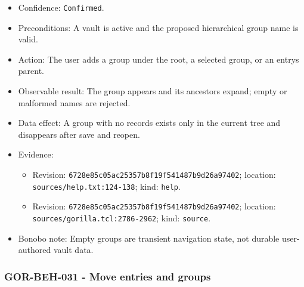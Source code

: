 \documentclass[
  letterpaper,
]{article}
\newcommand{\passthrough}[1]{#1}
\providecommand{\tightlist}{%
  \setlength{\itemsep}{0pt}\setlength{\parskip}{0pt}}
\begin{document}
\begin{itemize}
\tightlist
\item
  Confidence: \passthrough{\lstinline!Confirmed!}.
\item
  Preconditions: A vault is active and the proposed hierarchical group name is valid.
\item
  Action: The user adds a group under the root, a selected group, or an entry\textquotesingle s parent.
\item
  Observable result: The group appears and its ancestors expand; empty or malformed names are rejected.
\item
  Data effect: A group with no records exists only in the current tree and disappears after save and reopen.
\item
  Evidence:

  \begin{itemize}
  \tightlist
  \item
    Revision: \nolinkurl{6728e85c05ac25357b8f19f541487b9d26a97402}; location: \nolinkurl{sources/help.txt:124-138};
    kind: \passthrough{\lstinline!help!}.
  \item
    Revision: \nolinkurl{6728e85c05ac25357b8f19f541487b9d26a97402}; location: \nolinkurl{sources/gorilla.tcl:2786-2962};
    kind: \passthrough{\lstinline!source!}.
  \end{itemize}
\item
  Bonobo note: Empty groups are transient navigation state, not durable user-authored vault data.
\end{itemize}

\subsubsection{GOR-BEH-031 - Move entries and groups}\label{gor-beh-031---move-entries-and-groups}
\end{document}

